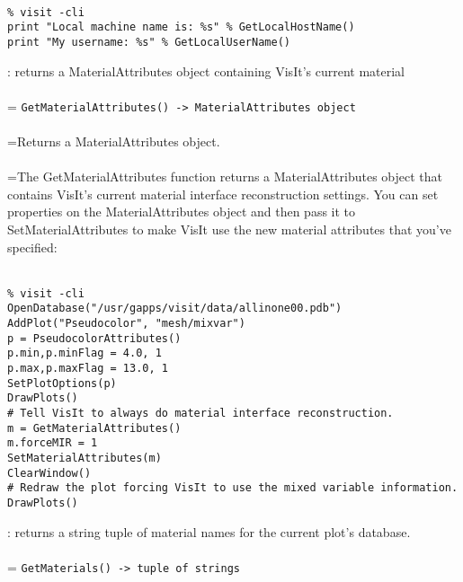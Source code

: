 \documentclass[10pt,a4paper]{report}
\begin{document}
\\[-6mm]
\begin{verbatim}% visit -cli
print "Local machine name is: %s" % GetLocalHostName()
print "My username: %s" % GetLocalUserName()
\end{verbatim}
\newpage


{}
: returns a MaterialAttributes object containing VisIt's current material\\[-3mm]

 \\ 
\hangindent=\parindent 
\verb!GetMaterialAttributes() -> MaterialAttributes object!\\ [-3mm]

 \\ 
\hangindent=\parindent Returns a MaterialAttributes object. \\[-3mm] 

 \\ 
\hangindent=\parindent The GetMaterialAttributes function returns a MaterialAttributes object that contains VisIt's current material interface reconstruction settings. You can set properties on the MaterialAttributes object and then pass it to SetMaterialAttributes to make VisIt use the new material attributes that you've specified: \\[-3mm] 

\\[-6mm]
\begin{verbatim}% visit -cli
OpenDatabase("/usr/gapps/visit/data/allinone00.pdb")
AddPlot("Pseudocolor", "mesh/mixvar")
p = PseudocolorAttributes()
p.min,p.minFlag = 4.0, 1
p.max,p.maxFlag = 13.0, 1
SetPlotOptions(p)
DrawPlots()
# Tell VisIt to always do material interface reconstruction.
m = GetMaterialAttributes()
m.forceMIR = 1
SetMaterialAttributes(m)
ClearWindow()
# Redraw the plot forcing VisIt to use the mixed variable information.
DrawPlots()
\end{verbatim}
\newpage


{}
: returns a string tuple of material names for the current plot's database.\\[-3mm]

 \\ 
\hangindent=\parindent 
\verb!GetMaterials() -> tuple of strings!\\ [-3mm]
\end{document}
